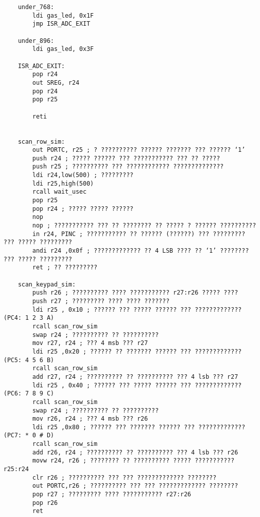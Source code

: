 \documentclass{article}
\begin{document}
\begin{verbatim}
	under_768:
		ldi gas_led, 0x1F
		jmp ISR_ADC_EXIT
		
	under_896:
		ldi gas_led, 0x3F

	ISR_ADC_EXIT:
		pop r24
		out SREG, r24
		pop r24
		pop r25

		reti
			

	scan_row_sim:
        out PORTC, r25 ; ? ?????????? ?????? ??????? ??? ?????? ‘1’
        push r24 ; ????? ?????? ??? ??????????? ??? ?? ?????
        push r25 ; ?????????? ??? ???????????? ??????????????
        ldi r24,low(500) ; ?????????
        ldi r25,high(500)
        rcall wait_usec
        pop r25
        pop r24 ; ????? ????? ??????
        nop
        nop ; ??????????? ??? ?? ???????? ?? ????? ? ?????? ??????????
        in r24, PINC ; ??????????? ?? ?????? (??????) ??? ????????? ??? ????? ?????????
        andi r24 ,0x0f ; ????????????? ?? 4 LSB ???? ?? ‘1’ ???????? ??? ????? ?????????
        ret ; ?? ?????????

	scan_keypad_sim:
        push r26 ; ?????????? ???? ??????????? r27:r26 ????? ????
        push r27 ; ????????? ???? ???? ???????
        ldi r25 , 0x10 ; ?????? ??? ????? ?????? ??? ????????????? (PC4: 1 2 3 A)
        rcall scan_row_sim
        swap r24 ; ?????????? ?? ??????????
        mov r27, r24 ; ??? 4 msb ??? r27
        ldi r25 ,0x20 ; ?????? ?? ??????? ?????? ??? ????????????? (PC5: 4 5 6 B)
        rcall scan_row_sim
        add r27, r24 ; ?????????? ?? ?????????? ??? 4 lsb ??? r27
        ldi r25 , 0x40 ; ?????? ??? ????? ?????? ??? ????????????? (PC6: 7 8 9 C)
        rcall scan_row_sim
        swap r24 ; ?????????? ?? ??????????
        mov r26, r24 ; ??? 4 msb ??? r26
        ldi r25 ,0x80 ; ?????? ??? ??????? ?????? ??? ????????????? (PC7: * 0 # D)
        rcall scan_row_sim
        add r26, r24 ; ?????????? ?? ?????????? ??? 4 lsb ??? r26
        movw r24, r26 ; ???????? ?? ?????????? ????? ??????????? r25:r24
        clr r26 ; ?????????? ??? ??? ????????????? ????????
        out PORTC,r26 ; ?????????? ??? ??? ????????????? ????????
        pop r27 ; ????????? ???? ??????????? r27:r26
        pop r26
        ret


\end{verbatim}
\end{document}

